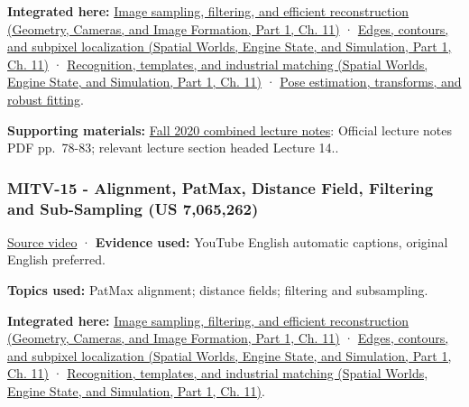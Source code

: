 \textbf{Integrated here:} \href{../03-Geometry-Cameras-and-Image-Formation-P01/main.pdf\#nameddest=03-visual-computing-i-ch004-image-sampling-filtering-and-efficient-reconstruction}{Image sampling, filtering, and efficient reconstruction (Geometry, Cameras, and Image Formation, Part 1, Ch. 11)} · \href{../05-Spatial-Worlds-Engine-State-and-Simulation-P01/main.pdf\#nameddest=04-visual-computing-ii-ch030-edges-contours-and-subpixel-localization}{Edges, contours, and subpixel localization (Spatial Worlds, Engine State, and Simulation, Part 1, Ch. 11)} · \href{../05-Spatial-Worlds-Engine-State-and-Simulation-P01/main.pdf\#nameddest=04-visual-computing-ii-ch030-recognition-templates-and-industrial-matching}{Recognition, templates, and industrial matching (Spatial Worlds, Engine State, and Simulation, Part 1, Ch. 11)} · \hyperref[04-visual-computing-ii-ch032-pose-estimation-transforms-and-robust-fitting]{Pose estimation, transforms, and robust fitting}.

\textbf{Supporting materials:} \href{https://ocw.mit.edu/courses/6-801-machine-vision-fall-2020/9ec44f69e72995c370b3797818ba01e6_MIT6_801F20_lectureNotes.pdf}{Fall 2020 combined lecture notes}: Official lecture notes PDF pp.~78-83; relevant lecture section headed Lecture 14..

\subsubsection{MITV-15 - Alignment, PatMax, Distance Field, Filtering and Sub-Sampling (US 7,065,262)}\label{04-visual-computing-ii-ch036-mitv-15---alignment-patmax-distance-field-filtering-and-sub-sampling-us-7065262}

\hypertarget{04-visual-computing-ii-ch036-mitv-15---alignment-patmax-distance-field-filtering-and-sub-sampling-us-7065262}{}

\href{https://www.youtube.com/watch?v=R1yLwFOfwwc}{Source video} · \textbf{Evidence used:} YouTube English automatic captions, original English preferred.

\textbf{Topics used:} PatMax alignment; distance fields; filtering and subsampling.

\textbf{Integrated here:} \href{../03-Geometry-Cameras-and-Image-Formation-P01/main.pdf\#nameddest=03-visual-computing-i-ch004-image-sampling-filtering-and-efficient-reconstruction}{Image sampling, filtering, and efficient reconstruction (Geometry, Cameras, and Image Formation, Part 1, Ch. 11)} · \href{../05-Spatial-Worlds-Engine-State-and-Simulation-P01/main.pdf\#nameddest=04-visual-computing-ii-ch030-edges-contours-and-subpixel-localization}{Edges, contours, and subpixel localization (Spatial Worlds, Engine State, and Simulation, Part 1, Ch. 11)} · \href{../05-Spatial-Worlds-Engine-State-and-Simulation-P01/main.pdf\#nameddest=04-visual-computing-ii-ch030-recognition-templates-and-industrial-matching}{Recognition, templates, and industrial matching (Spatial Worlds, Engine State, and Simulation, Part 1, Ch. 11)}.

